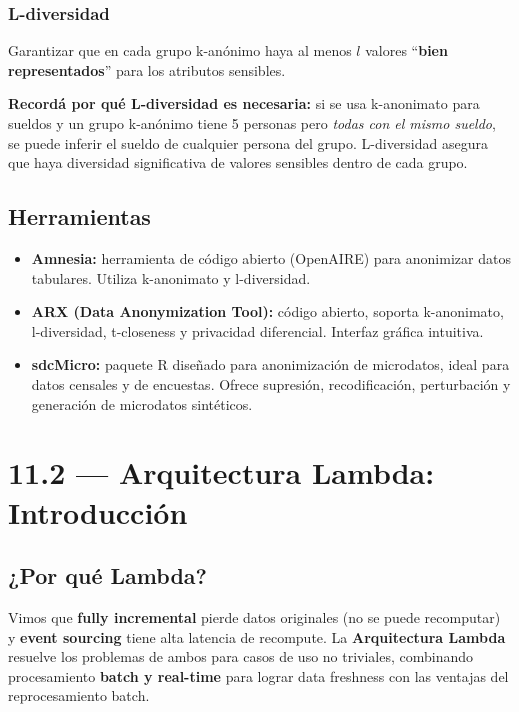 \documentclass[11pt, a4paper]{article}
\begin{document}
\subsubsection{L-diversidad}
Garantizar que en cada grupo k-anónimo haya al menos $l$ valores ``\textbf{bien representados}'' para los atributos sensibles.

\begin{recallbox}
	\textbf{Recordá por qué L-diversidad es necesaria:} si se usa k-anonimato para sueldos y un grupo k-anónimo tiene 5 personas pero \textit{todas con el mismo sueldo}, se puede inferir el sueldo de cualquier persona del grupo. L-diversidad asegura que haya diversidad significativa de valores sensibles dentro de cada grupo.
\end{recallbox}

\subsection{Herramientas}
\begin{itemize}
	\item \textbf{Amnesia:} herramienta de código abierto (OpenAIRE) para anonimizar datos tabulares. Utiliza k-anonimato y l-diversidad.
	\item \textbf{ARX (Data Anonymization Tool):} código abierto, soporta k-anonimato, l-diversidad, t-closeness y privacidad diferencial. Interfaz gráfica intuitiva.
	\item \textbf{sdcMicro:} paquete R diseñado para anonimización de microdatos, ideal para datos censales y de encuestas. Ofrece supresión, recodificación, perturbación y generación de microdatos sintéticos.
\end{itemize}

\section{11.2 — Arquitectura Lambda: Introducción}

\subsection{¿Por qué Lambda?}

Vimos que \textbf{fully incremental} pierde datos originales (no se puede recomputar) y \textbf{event sourcing} tiene alta latencia de recompute. La \textbf{Arquitectura Lambda} resuelve los problemas de ambos para casos de uso no triviales, combinando procesamiento \textbf{batch y real-time} para lograr data freshness con las ventajas del reprocesamiento batch.
\end{document}
